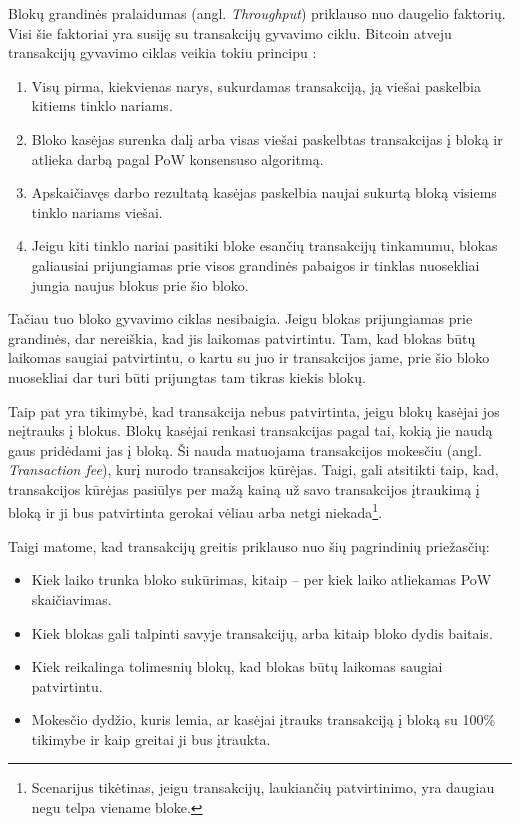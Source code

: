 

Blokų grandinės pralaidumas (angl. \textit{Throughput}) priklauso nuo daugelio faktorių. Visi šie faktoriai yra susiję su transakcijų gyvavimo ciklu. Bitcoin atveju transakcijų gyvavimo ciklas veikia tokiu principu \cite{nakamoto2008bitcoin}:
\begin{enumerate}
    \item Visų pirma, kiekvienas narys, sukurdamas transakciją, ją viešai paskelbia kitiems tinklo nariams. 
    \item Bloko kasėjas surenka dalį arba visas viešai paskelbtas transakcijas į bloką ir atlieka darbą pagal PoW konsensuso algoritmą.
    \item Apskaičiavęs darbo rezultatą kasėjas paskelbia naujai sukurtą bloką visiems tinklo nariams viešai. 
    \item Jeigu kiti tinklo nariai pasitiki bloke esančių transakcijų tinkamumu, blokas galiausiai prijungiamas prie visos grandinės pabaigos ir tinklas nuosekliai jungia naujus blokus prie šio bloko. 
\end{enumerate}

Tačiau tuo bloko gyvavimo ciklas nesibaigia. Jeigu blokas prijungiamas prie grandinės, dar nereiškia, kad jis laikomas patvirtintu. Tam, kad blokas būtų laikomas saugiai patvirtintu, o kartu su juo ir transakcijos jame, prie šio bloko nuosekliai dar turi būti prijungtas tam tikras kiekis blokų. 

Taip pat yra tikimybė, kad transakcija nebus patvirtinta, jeigu blokų kasėjai jos neįtrauks į blokus. Blokų kasėjai renkasi transakcijas pagal tai, kokią jie naudą gaus pridėdami jas į bloką. Ši nauda matuojama transakcijos mokesčiu (angl. \textit{Transaction fee}), kurį nurodo transakcijos kūrėjas. Taigi, gali atsitikti taip, kad, transakcijos kūrėjas pasiūlys per mažą kainą už savo transakcijos įtraukimą į bloką ir ji bus patvirtinta gerokai vėliau arba netgi niekada\footnote{Scenarijus tikėtinas, jeigu transakcijų, laukiančių patvirtinimo, yra daugiau negu telpa viename bloke.}.

Taigi matome, kad transakcijų greitis priklauso nuo šių pagrindinių priežasčių: 
\begin{itemize}
    \item Kiek laiko trunka bloko sukūrimas, kitaip – per kiek laiko atliekamas PoW skaičiavimas.
    \item Kiek blokas gali talpinti savyje transakcijų, arba kitaip bloko dydis baitais.
    \item Kiek reikalinga tolimesnių blokų, kad blokas būtų laikomas saugiai patvirtintu.
    \item Mokesčio dydžio, kuris lemia, ar kasėjai įtrauks transakciją į bloką su 100\% tikimybe ir kaip greitai ji bus įtraukta.
\end{itemize} 

